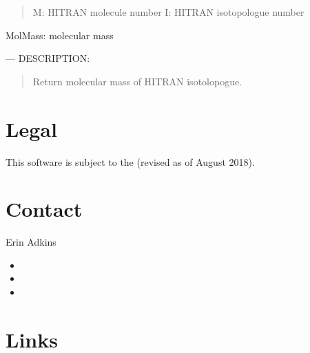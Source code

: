 \documentclass[letterpaper,10pt,english]{sphinxmanual}
\begin{document}
\begin{fulllineitems}
\begin{quote}
\sphinxAtStartPar
M: HITRAN molecule number
I: HITRAN isotopologue number
\end{quote}
\begin{description}
\sphinxAtStartPar
MolMass: molecular mass

\end{description}

\sphinxAtStartPar
—
DESCRIPTION:
\begin{quote}

\sphinxAtStartPar
Return molecular mass of HITRAN isotolopogue.
\end{quote}

\end{fulllineitems}



\chapter{Legal}
\label{\detokenize{index:legal}}
\sphinxAtStartPar
This software is subject to the  (revised as of August 2018).


\chapter{Contact}
\label{\detokenize{index:contact}}
\sphinxAtStartPar
Erin Adkins
\begin{itemize}
\item {} 
\sphinxAtStartPar
{}

\item {} 
\sphinxAtStartPar
{}

\item {} 
\sphinxAtStartPar
{}

\end{itemize}


\chapter{Links}
\label{\detokenize{index:links}}
\sphinxAtStartPar
{}

\sphinxAtStartPar
{}
\end{document}
